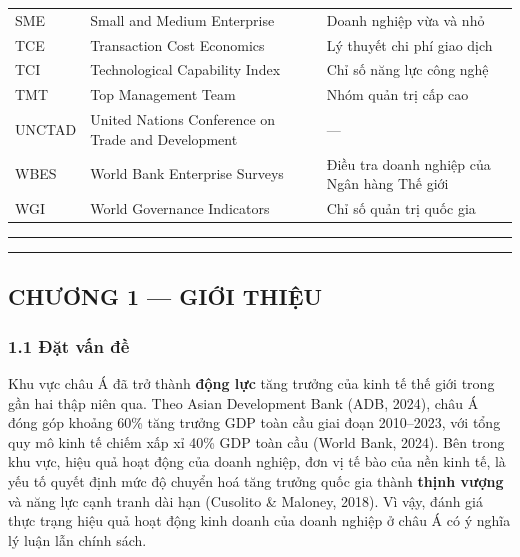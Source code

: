 \documentclass[12pt,a4paper]{article}
\begin{document}
\begin{longtable}[]{@{}lll@{}}
SME & Small and Medium Enterprise & Doanh nghiệp vừa và nhỏ \\
TCE & Transaction Cost Economics & Lý thuyết chi phí giao dịch \\
TCI & Technological Capability Index & Chỉ số năng lực công nghệ \\
TMT & Top Management Team & Nhóm quản trị cấp cao \\
UNCTAD & United Nations Conference on Trade and Development & --- \\
WBES & World Bank Enterprise Surveys & Điều tra doanh nghiệp của Ngân
hàng Thế giới \\
WGI & World Governance Indicators & Chỉ số quản trị quốc gia \\
\end{longtable}

\begin{center}\rule{0.5\linewidth}{0.5pt}\end{center}

\begin{center}\rule{0.5\linewidth}{0.5pt}\end{center}

\hypertarget{chux1b0ux1a1ng-1--giux1edbi-thiux1ec7u}{%
\subsection{CHƯƠNG 1 --- GIỚI
THIỆU}\label{chux1b0ux1a1ng-1--giux1edbi-thiux1ec7u}}

\hypertarget{11-ux111ux1eb7t-vux1ea5n-ux111ux1ec1}{%
\subsubsection{1.1 Đặt vấn
đề}\label{11-ux111ux1eb7t-vux1ea5n-ux111ux1ec1}}

Khu vực châu Á đã trở thành \textbf{động lực} tăng trưởng của kinh tế
thế giới trong gần hai thập niên qua. Theo Asian Development Bank (ADB,
2024), châu Á đóng góp khoảng 60\% tăng trưởng GDP toàn cầu giai đoạn
2010--2023, với tổng quy mô kinh tế chiếm xấp xỉ 40\% GDP toàn cầu
(World Bank, 2024). Bên trong khu vực, hiệu quả hoạt động của doanh
nghiệp, đơn vị tế bào của nền kinh tế, là yếu tố quyết định mức độ
chuyển hoá tăng trưởng quốc gia thành \textbf{thịnh vượng} và năng lực
cạnh tranh dài hạn (Cusolito \& Maloney, 2018). Vì vậy, đánh giá thực
trạng hiệu quả hoạt động kinh doanh của doanh nghiệp ở châu Á có ý nghĩa
lý luận lẫn chính sách.
\end{document}

